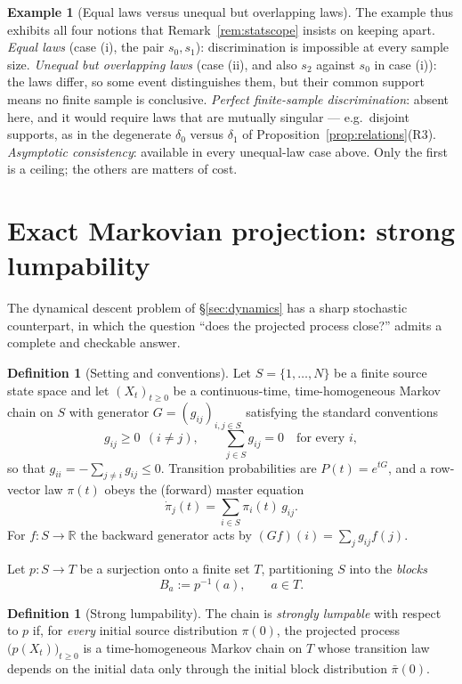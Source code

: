 \documentclass[11pt,reqno]{amsart}
\theoremstyle{plain}
\theoremstyle{definition}
\newtheorem{definition}[theorem]{Definition}
\newtheorem{example}[theorem]{Example}
\theoremstyle{remark}
\begin{document}
\begin{example}[Equal laws versus unequal but overlapping laws]
The example thus exhibits all four notions that Remark~\ref{rem:statscope} insists on keeping apart. \emph{Equal laws} (case (i), the pair $s_0,s_1$): discrimination is impossible at every sample size. \emph{Unequal but overlapping laws} (case (ii), and also $s_2$ against $s_0$ in case (i)): the laws differ, so some event distinguishes them, but their common support means no finite sample is conclusive. \emph{Perfect finite-sample discrimination}: absent here, and it would require laws that are mutually singular --- e.g.\ disjoint supports, as in the degenerate $\delta_0$ versus $\delta_1$ of Proposition~\ref{prop:relations}(R3). \emph{Asymptotic consistency}: available in every unequal-law case above. Only the first is a ceiling; the others are matters of cost.
\end{example}

\section{Exact Markovian projection: strong lumpability}\label{sec:lumpability}

The dynamical descent problem of \S\ref{sec:dynamics} has a sharp stochastic counterpart, in which the question ``does the projected process close?'' admits a complete and checkable answer.

\begin{definition}[Setting and conventions]\label{def:chain}
Let $S=\{1,\dots,N\}$ be a finite source state space and let $(X_t)_{t\ge0}$ be a continuous-time, time-homogeneous Markov chain on $S$ with generator $G=(g_{ij})_{i,j\in S}$ satisfying the standard conventions
\begin{equation}\label{eq:generator}
g_{ij}\ge0\ \ (i\neq j),\qquad \sum_{j\in S}g_{ij}=0\quad\text{for every }i ,
\end{equation}
so that $g_{ii}=-\sum_{j\neq i}g_{ij}\le0$. Transition probabilities are $P(t)=e^{tG}$, and a row-vector law $\pi(t)$ obeys the (forward) master equation
\begin{equation}\label{eq:master}
\dot\pi_j(t)=\sum_{i\in S}\pi_i(t)\,g_{ij}.
\end{equation}
For $f\colon S\to\mathbb R$ the backward generator acts by $(Gf)(i)=\sum_{j}g_{ij}f(j)$.

Let $p\colon S\to T$ be a surjection onto a finite set $T$, partitioning $S$ into the \emph{blocks}
\[
B_a:=p^{-1}(a),\qquad a\in T .
\]
\end{definition}

\begin{definition}[Strong lumpability]\label{def:lumpable}
The chain is \emph{strongly lumpable} with respect to $p$ if, for \emph{every} initial source distribution $\pi(0)$, the projected process $\bigl(p(X_t)\bigr)_{t\ge0}$ is a time-homogeneous Markov chain on $T$ whose transition law depends on the initial data only through the initial block distribution $\bar\pi(0)$.
\end{definition}
\end{document}
